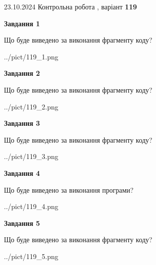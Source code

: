 \documentclass[12pt, ukrainian]{article}
\begin{document}
{\Large{23.10.2024 Контрольна робота , варіант  \No \textbf { 119 }\par}}
{
\begin {large}
{\begin {center}\textbf{Завдання 1}\end {center}}

Що буде виведено за виконання фрагменту коду?\par
\begin{center}
	{../pict/119_1.png}
\end{center}
\newpage

{\begin {center}\textbf{Завдання 2}\end {center}}

Що буде виведено за виконання фрагменту коду?\par
\begin{center}
	{../pict/119_2.png}
\end{center}
\newpage

{\begin {center}\textbf{Завдання 3}\end {center}}

Що буде виведено за виконання фрагменту коду?\par
\begin{center}
	{../pict/119_3.png}
\end{center}
\newpage

{\begin {center}\textbf{Завдання 4}\end {center}}

Що буде виведено за виконання програми?\par
\begin{center}
	{../pict/119_4.png}
\end{center}
\newpage

{\begin {center}\textbf{Завдання 5}\end {center}}

Що буде виведено за виконання фрагменту коду?\par
\begin{center}
	{../pict/119_5.png}
\end{center}
\newpage


\end{large}}
\end{document}
